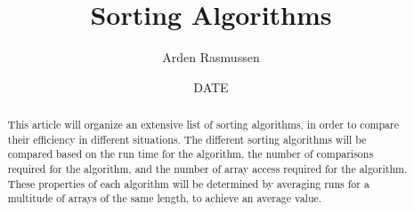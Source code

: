 \documentclass[10pt]{article}
\title{Sorting Algorithms}
\author{Arden Rasmussen}
\date{DATE}
\begin{document}
\maketitle
\newpage
\tableofcontents
\newpage
{}
\begin{abstract}
This article will organize an extensive list of sorting algorithms, in order to compare their efficiency in different situations. The different sorting algorithms will be compared based on the run time for the algorithm, the number of comparisons required for the algorithm, and the number of array access required for the algorithm. These properties of each algorithm will be determined by averaging runs for a multitude of arrays of the same length, to achieve an average value.
\end{abstract}
\newpage


\end{document}
